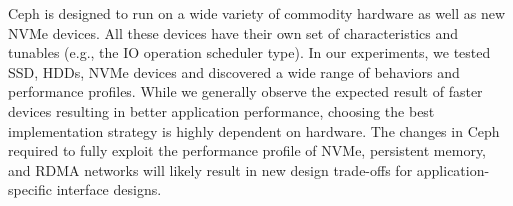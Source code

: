 Ceph is designed to run on a wide variety of commodity hardware as well as new
NVMe devices. All these devices have their own set of characteristics and
tunables (e.g., the IO operation scheduler type). In our experiments, we tested
SSD, HDDs, NVMe devices and discovered a wide range of behaviors and
performance profiles. While we generally observe the expected result of faster
devices resulting in better application performance, choosing the best
implementation strategy is highly dependent on hardware. The changes in Ceph
required to fully exploit the performance profile of NVMe, persistent
memory, and RDMA networks will likely result in new design trade-offs for
application-specific interface designs.
